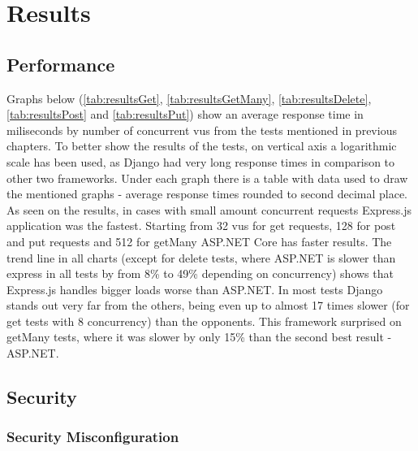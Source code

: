 
\chapter{Results}\label{cha:results}

\section{Performance}

Graphs below (\ref{tab:resultsGet}, \ref{tab:resultsGetMany}, \ref{tab:resultsDelete}, \ref{tab:resultsPost} and \ref{tab:resultsPut}) show an average response time in miliseconds by number of concurrent \acrshort{vu}s from the tests mentioned in previous chapters. To better show the results of the tests, on vertical axis a logarithmic scale has been used, as Django had very long response times in comparison to other two frameworks. Under each graph there is a table with data used to draw the mentioned graphs - average response times rounded to second decimal place. As seen on the results, in cases with small amount concurrent requests Express.js application was the fastest. Starting from 32 \acrlong{vu}s for get requests, 128 for post and put requests and 512 for getMany ASP.NET Core has faster results. The trend line in all charts (except for delete tests, where ASP.NET is slower than express in all tests by from 8\% to 49\% depending on concurrency) shows that Express.js handles bigger loads worse than ASP.NET. In most tests Django stands out very far from the others, being even up to almost 17 times slower (for get tests with 8 concurrency) than the opponents. This framework surprised on getMany tests, where it was slower by only 15\% than the second best result - ASP.NET. 
















\section{Security}
\subsection{Security Misconfiguration}
